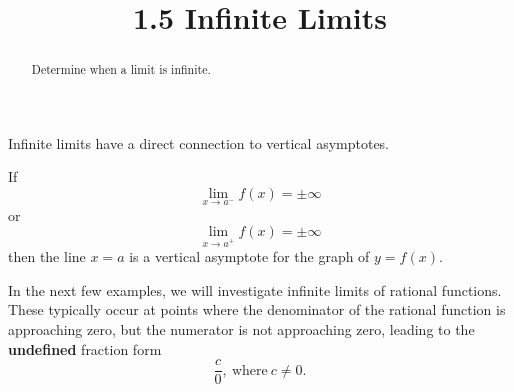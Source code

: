 \documentclass[handout]{ximera}
\title{1.5 Infinite Limits}
\begin{document}
\begin{abstract}
Determine when a limit is infinite.
\end{abstract}

\maketitle

Infinite limits have a direct connection to vertical asymptotes.
\begin{theorem}
If 
\[
\lim_{x \to a^-} f(x) = \pm \infty
\]
or
\[
\lim_{x \to a^+} f(x) = \pm \infty
\]
then the line $x=a$ is a vertical asymptote for the graph of $y=f(x)$.\\
\end{theorem}




In the next few examples, we will investigate infinite limits of rational functions. 
These typically occur at points where the denominator of the rational function is approaching zero, 
but the numerator is not approaching zero, leading to the \textbf{undefined} fraction form
\[
\frac{c}{0}, \ \text{where} \ c \neq 0.
\]
\end{document}
